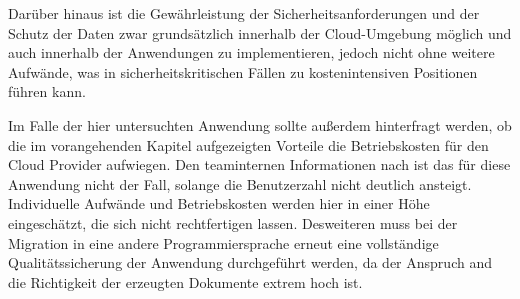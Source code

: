 Darüber hinaus ist die Gewährleistung der Sicherheitsanforderungen und der Schutz der Daten zwar grundsätzlich innerhalb der Cloud-Umgebung möglich und auch innerhalb der Anwendungen zu implementieren, jedoch nicht ohne weitere Aufwände, was in sicherheitskritischen Fällen zu kostenintensiven Positionen führen kann. 

Im Falle der hier untersuchten Anwendung sollte außerdem hinterfragt werden, ob die im vorangehenden Kapitel aufgezeigten Vorteile die Betriebskosten für den Cloud Provider aufwiegen. Den teaminternen Informationen nach ist das für diese Anwendung nicht der Fall, solange die Benutzerzahl nicht deutlich ansteigt. Individuelle Aufwände und Betriebskosten werden hier in einer Höhe eingeschätzt, die sich nicht rechtfertigen lassen. Desweiteren muss bei der Migration in eine andere Programmiersprache erneut eine vollständige Qualitätssicherung der Anwendung durchgeführt werden, da der Anspruch and die Richtigkeit der erzeugten Dokumente extrem hoch ist.
\pagebreak